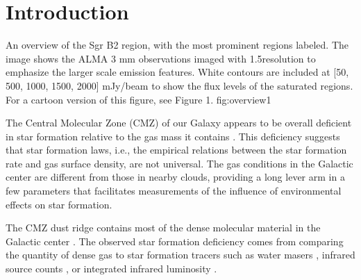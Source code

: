 \documentclass[twocolumn]{aastex61}
\begin{document}



\section{Introduction}

{An overview of the Sgr B2 region, with the most prominent regions labeled.
The image shows the ALMA 3 mm observations imaged with 1.5\arcsec resolution
to emphasize the larger scale emission features.  White contours
are included at [50, 500, 1000, 1500, 2000] mJy/beam to show the flux levels
of the saturated regions.  For a cartoon version of this
figure, see \citet{Schmiedeke2016a} Figure 1.}
{fig:overview}{1}{\textwidth}

The Central Molecular Zone (CMZ) of our Galaxy appears to be overall deficient
in star formation relative to the gas mass it contains
\citep{Beuther2012a,Immer2012a,Longmore2013a,
Kauffmann2017c,Kauffmann2017b,Barnes2017b}.  This deficiency
suggests that star formation laws, i.e., the empirical relations between
the star formation rate and gas surface density, are not universal.  The gas
conditions in the Galactic center are different from those in nearby clouds,
providing a long lever arm in a few
parameters \citep[e.g., pressure, temperature, velocity
dispersion;
][]{Kruijssen2013a,Ginsburg2016a,Immer2016a,Shetty2012a,Henshaw2016a} that
facilitates measurements of the influence of environmental effects on star
formation.

The CMZ dust ridge contains most of the dense molecular material in the
Galactic center \citep{Lis1999a,Bally2010a,Molinari2011a}.  The observed star
formation deficiency comes from comparing the quantity of dense gas to  star
formation tracers such as water masers \citep{Longmore2013a}, infrared source
counts \citep{Yusef-Zadeh2009a}, or integrated infrared luminosity
\citep{Barnes2017b}. 
\end{document}
